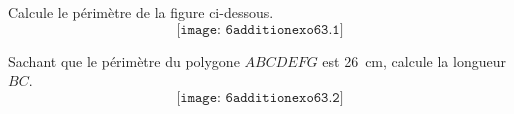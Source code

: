 \begin{multicols}{2}
  Calcule le périmètre de la figure ci-dessous.
  \[\texttt{[image: 6additionexo63.1]}\]
  \par\columnbreak\par
  Sachant que le périmètre du polygone $ABCDEFG$ est 26~cm,
  calcule la longueur $BC$.
  \[\texttt{[image: 6additionexo63.2]}\]
\end{multicols}